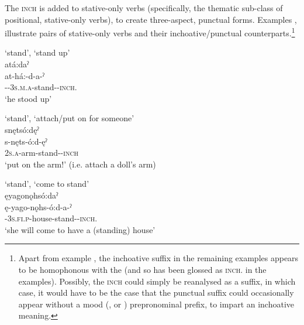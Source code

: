 The  \textsc{inch} is added to stative-only verbs (specifically, the thematic sub-class of positional, stative-only verbs), to create three-aspect, punctual forms. Examples , illustrate pairs of stative-only verbs and their inchoative/punctual counterparts.\footnote{Apart from example , the inchoative suffix in the remaining examples appears to be homophonous with the  {\punctual} (and so has been glossed as \textsc{inch.\zeropunctual} in the examples). Possibly, the  \textsc{inch} could simply be reanalysed as a  {\punctual} suffix, in which case, it would have to be the case that the punctual suffix could occasionally appear without a mood ({\future}, {\factual} or {\indefinite}) prepronominal prefix, to impart an inchoative meaning.}


\ea\label{ex:inchex}  ‘stand’,  ‘stand up’\\
atá:daˀ\\
\gll at-há:-d-a-ˀ\\
 {\factual-\dualic}-\textsc{3s.m.a}-stand-{\joinerA}-\textsc{inch}.{\zeropunctual}\\
\glt `he stood up'
\z 


\ea\label{ex:inchex2}  ‘stand’,  ‘attach/put on for someone’\\
snętsó:dęˀ\\
\gll s-nęts-ó:d-ęˀ\\
 \textsc{2s.a}-arm-stand-{\benefactive}-\textsc{inch}\\
\glt `put on the arm!' (i.e. attach a doll's arm)
\z 

\newpage
\ea\label{ex:inchex3}  ‘stand’,  ‘come to stand’\\
ęyagonǫhsó:daˀ\\
\gll ę-yago-nǫhs-ó:d-a-ˀ\\
  {\future}-\textsc{3s.fi.p}-house-stand-{\joinerA}-\textsc{inch}.{\zeropunctual}\\
\glt `she will come to have a (standing) house'
\z 

